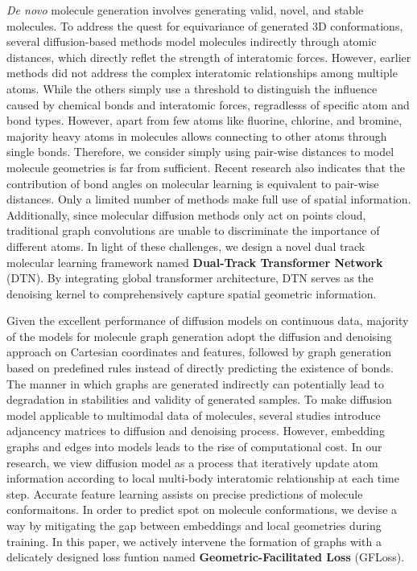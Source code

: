 \documentclass[letterpaper]{article} %
\begin{document}
{\itshape De novo} molecule generation involves generating valid, novel, and stable molecules. To address the quest for equivariance of generated 3D conformations, several diffusion-based methods \cite{edm_22_hoogeboom,mdm_23_huang} model molecules indirectly through atomic distances, which directly reflet the strength of interatomic forces. However, earlier methods \cite{edm_22_hoogeboom} did not address the complex interatomic relationships among multiple atoms. While the others \cite{mdm_23_huang} simply use a threshold to distinguish the influence caused by chemical bonds and interatomic forces, regradlesss of specific atom and bond types. However, apart from few atoms like fluorine, chlorine, and bromine, majority heavy atoms in molecules allows connecting to other atoms through single bonds. Therefore, we consider simply using pair-wise distances to model molecule geometries is far from sufficient. Recent research \cite{moleformer_23_yuan} also indicates that the contribution of bond angles on molecular learning is equivalent to pair-wise distances. Only a limited number of methods make full use of spatial information. Additionally, since molecular diffusion methods only act on points cloud, traditional graph convolutions are unable to discriminate the importance of different atoms. In light of these challenges, we design a novel dual track molecular learning framework named \textbf{Dual-Track Transformer Network} (DTN). By integrating global transformer architecture, DTN serves as the denoising kernel to comprehensively capture spatial geometric information.

Given the excellent performance of diffusion models on continuous data, majority of the models for molecule graph generation adopt the diffusion and denoising approach on Cartesian coordinates and features, followed by graph generation based on predefined rules instead of directly predicting the existence of bonds. The manner in which graphs are generated indirectly can potentially lead to degradation in stabilities and validity of generated samples. To make diffusion model applicable to multimodal data of molecules, several studies \cite{edpgnn_20_niu,digress_22_vignac,midi_23_vignac} introduce adjancency matrices to diffusion and denoising process. However, embedding graphs and edges into models leads to the rise of computational cost. In our research, we view diffusion model as a process that iteratively update atom information according to local multi-body interatomic relationship at each time step. Accurate feature learning assists on precise predictions of molecule conformaitons. In order to predict spot on molecule conformations, we devise a way by mitigating the gap between embeddings and local geometries during training. In this paper, we actively intervene the formation of graphs with a delicately designed loss funtion named \textbf{Geometric-Facilitated Loss} (GFLoss).
\end{document}
